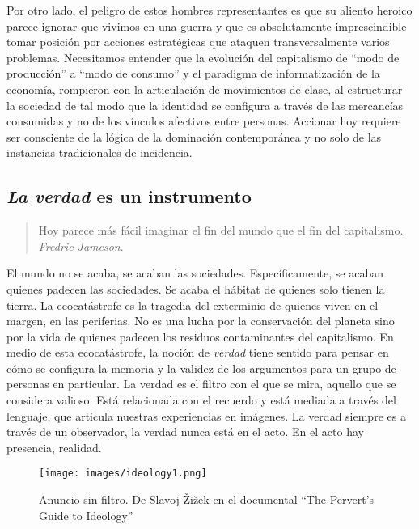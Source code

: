 Por otro lado, el peligro de estos hombres representantes es que su aliento heroico parece ignorar que vivimos en una guerra y que es absolutamente imprescindible tomar posición por acciones estratégicas que ataquen transversalmente varios problemas. Necesitamos entender que la evolución del capitalismo de \enquote{modo de producción}\revquotes{} a \enquote{modo de consumo}\revquotes{} y el paradigma de informatización de la economía, rompieron con la articulación de movimientos de clase, al estructurar la sociedad de tal modo que la identidad se configura a través de las mercancías consumidas y no de los vínculos afectivos entre personas. Accionar hoy requiere ser consciente de la lógica de la dominación contemporánea y no solo de las instancias tradicionales de incidencia.

\subsection{\emph{La verdad} es un instrumento}
\label{sub:verdadinstrumental}

\begin{quote}
	Hoy parece más fácil imaginar el fin del mundo que el fin del
	capitalismo.\\ \emph{Fredric Jameson}.
\end{quote}

El mundo no se acaba, se acaban las sociedades. Específicamente, se acaban quienes padecen las sociedades. Se acaba el hábitat de quienes solo tienen la tierra. La ecocatástrofe es la tragedia del exterminio de quienes viven en el margen, en las periferias. No es una lucha por la conservación del planeta sino por la vida de quienes padecen los residuos contaminantes del capitalismo. En medio de esta ecocatástrofe, la noción de \emph{verdad} tiene sentido para pensar en cómo se configura la memoria y la validez de los argumentos para un grupo de personas en particular. La verdad es el filtro con el que se mira, aquello que se considera valioso. Está relacionada con el recuerdo y está mediada a través del lenguaje, que articula nuestras experiencias en imágenes. La verdad siempre es a través de un observador, la verdad nunca está en el acto. En el acto hay presencia, realidad.

\begin{figure}[htbp]
	\centering	\texttt{[image: images/ideology1.png]}
	\caption[Anuncio sin filtro.]{Anuncio sin filtro. De Slavoj Žižek en el documental \enquote{The Pervert's Guide to Ideology}}
\end{figure}

